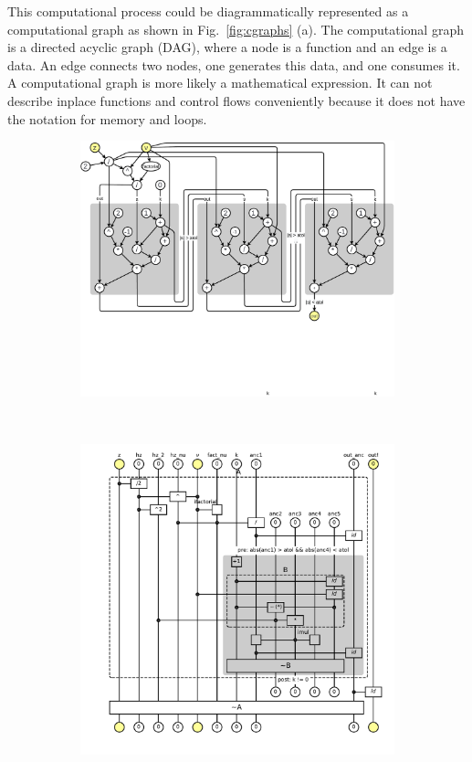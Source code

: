 \documentclass{article}
\newcommand{\<}{\langle}
\renewcommand{\>}{\rangle}
\newcommand{\Fig}[1]{Fig.~\ref{#1}}
\theoremstyle{definition}\newtheorem{definition}{\textit{Definition}}
\begin{document}
This computational process could be diagrammatically represented as a computational graph as shown in \Fig{fig:cgraphs} (a).
The computational graph is a directed acyclic graph (DAG), where a node is a function and an edge is a data.
An edge connects two nodes, one generates this data, and one consumes it.
A computational graph is more likely a mathematical expression. It can not describe inplace functions and control flows conveniently because it does not have the notation for memory and loops.
\begin{figure}[t!]
    \centering
    \begin{subfigure}[t]{0.52\textwidth}
        \centering
        \includegraphics[width=\textwidth,trim={0 4cm 0 0cm},clip]{computational_graph.pdf}
        \caption{}
    \end{subfigure}%
    ~
    \begin{subfigure}[t]{0.47\textwidth}
        \centering
        \includegraphics[width=\textwidth,trim={0 1cm 0 0cm},clip]{fig4.pdf}

\end{subfigure}
\end{figure}
\end{document}

